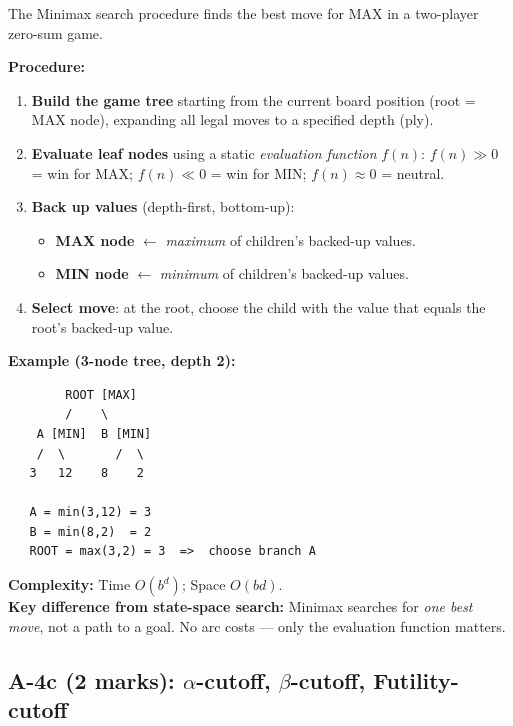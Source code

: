 \documentclass[12pt, a4paper]{article}
\newenvironment{answerbox}{\begin{mdframed}[style=answerframe]}{\end{mdframed}}
\begin{document}
\begin{answerbox}
The Minimax search procedure finds the best move for MAX in a two-player zero-sum game.

\textbf{Procedure:}
\begin{enumerate}[noitemsep]
  \item \textbf{Build the game tree} starting from the current board position (root = MAX node), expanding all legal moves to a specified depth (ply).
  \item \textbf{Evaluate leaf nodes} using a static \textit{evaluation function} $f(n)$:
        $f(n) \gg 0$ = win for MAX; $f(n) \ll 0$ = win for MIN; $f(n) \approx 0$ = neutral.
  \item \textbf{Back up values} (depth-first, bottom-up):
    \begin{itemize}[noitemsep]
      \item \textbf{MAX node} $\leftarrow$ \textit{maximum} of children's backed-up values.
      \item \textbf{MIN node} $\leftarrow$ \textit{minimum} of children's backed-up values.
    \end{itemize}
  \item \textbf{Select move}: at the root, choose the child with the value that equals the root's backed-up value.
\end{enumerate}

\textbf{Example (3-node tree, depth 2):}
\begin{verbatim}
        ROOT [MAX]
        /    \
    A [MIN]  B [MIN]
    /  \       /  \
   3   12    8    2

   A = min(3,12) = 3
   B = min(8,2)  = 2
   ROOT = max(3,2) = 3  =>  choose branch A
\end{verbatim}

\textbf{Complexity:} Time $O(b^d)$; Space $O(bd)$.\\
\textbf{Key difference from state-space search:} Minimax searches for \textit{one best move}, not a path to a goal. No arc costs --- only the evaluation function matters.
\end{answerbox}

\subsection{A-4c (2 marks): $\alpha$-cutoff, $\beta$-cutoff, Futility-cutoff}
\end{document}
